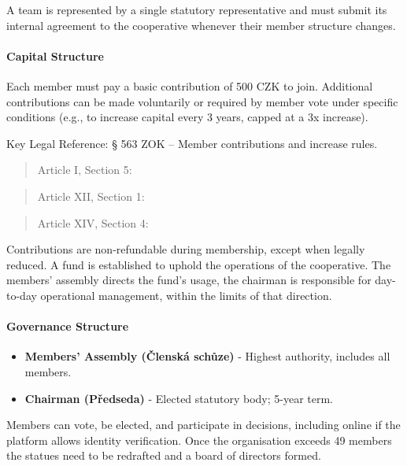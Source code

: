 A team is represented by a single statutory representative and must submit its internal agreement to the cooperative whenever their member structure changes.
\paragraph{Capital Structure}
Each member must pay a basic contribution of 500 CZK to join. Additional contributions can be made voluntarily or required by member vote under specific conditions (e.g., to increase capital every 3 years, capped at a 3x increase). 

Key Legal Reference: § 563 ZOK – Member contributions and increase rules.
\begin{quote}
    Article I, Section 5: 
\end{quote}
\begin{quote}
    Article XII, Section 1: 
\end{quote}
\begin{quote}
    Article XIV, Section 4: 
\end{quote}

Contributions are non-refundable during membership, except when legally reduced. A fund is established to uphold the operations of the cooperative. The members’ assembly directs the fund’s usage, the chairman is responsible for day-to-day operational management, within the limits of that direction.
\paragraph{Governance Structure}
\begin{itemize}
    \item \textbf{Members’ Assembly (Členská schůze)} - Highest authority, includes all members.
    \item \textbf{Chairman (Předseda)} - Elected statutory body; 5-year term.
\end{itemize}
Members can vote, be elected, and participate in decisions, including online if the platform allows identity verification. Once the organisation exceeds 49 members the statues need to be redrafted and a board of directors formed.

